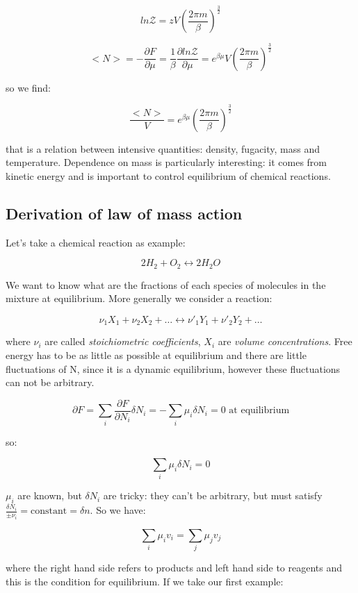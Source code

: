 \documentclass[a4paper, italian, openany]{book}
\begin{document}
$$ln \mathcal{Z} = z V \left ( \frac{2\pi m}{\beta} \right )^{\frac{3}{2}}$$

$$<N> = - \frac{\partial F}{\partial \mu} = \frac{1}{\beta} \frac{\partial ln \mathcal{Z}}{\partial \mu} = e^{\beta \mu} V \left ( \frac{2\pi m}{\beta} \right )^{\frac{3}{2}}$$

so we find:

$$\frac{<N>}{V} = e^{\beta \mu} \left ( \frac{2 \pi m}{\beta}\right )^{\frac{3}{2}}$$

that is a relation between intensive quantities: density, fugacity, mass and temperature. Dependence on mass is particularly interesting: it comes from kinetic energy and is important to control equilibrium of chemical reactions.

\subsection{Derivation of law of mass action}

Let's take a chemical reaction as example:

$$2 H_2 + O_2 \leftrightarrow 2H_2 O$$

We want to know what are the fractions of each species of molecules in the mixture at equilibrium. More generally we consider a reaction:

$$ \nu_1 X_1 + \nu_2 X_2 + \ldots \leftrightarrow \nu'_1 Y_1 + \nu'_2 Y_2 + \ldots$$

where $\nu_i$ are called \textit{stoichiometric coefficients}, $X_i$ are \textit{volume concentrations}.\newline
Free energy has to be as little as possible at equilibrium and there are little fluctuations of N, since it is a dynamic equilibrium, however these fluctuations can not be arbitrary.

$$\partial F = \sum_i \frac{\partial F}{\partial N_i} \delta N_i = -\sum_i \mu_i \delta N_i = 0 \mbox{ at equilibrium}$$

so:

$$\sum_i \mu_i \delta N_i = 0$$

$\mu_i$ are known, but $\delta N_i$ are tricky: they can't be arbitrary, but must satisfy $\frac{\delta N_i}{\pm \nu_i} = \mbox{constant} = \delta n$. So we have:

$$\sum_i \mu_i v_i = \sum_j \mu_j v_j$$

where the right hand side refers to products and left hand side to reagents and this is the condition for equilibrium.\newline
If we take our first example:
\end{document}
